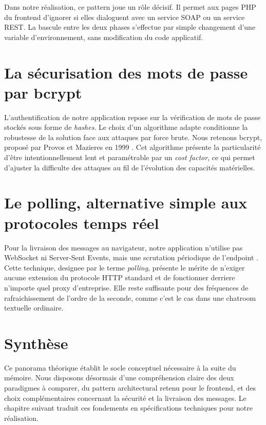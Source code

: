 Dans notre réalisation, ce pattern joue un rôle décisif. Il permet aux pages PHP du frontend d'ignorer si elles dialoguent avec un service SOAP ou un service REST. La bascule entre les deux phases s'effectue par simple changement d'une variable d'environnement, sans modification du code applicatif.

\section{La sécurisation des mots de passe par bcrypt}

L'authentification de notre application repose sur la vérification de mots de passe stockés sous forme de \emph{hashes}. Le choix d'un algorithme adapte conditionne la robustesse de la solution face aux attaques par force brute. Nous retenons bcrypt, proposé par Provos et Mazieres en 1999 \citep{provos1999}. Cet algorithme présente la particularité d'être intentionnellement lent et paramétrable par un \emph{cost factor}, ce qui permet d'ajuster la difficulte des attaques au fil de l'évolution des capacités matérielles.

\section{Le polling, alternative simple aux protocoles temps réel}

Pour la livraison des messages au navigateur, notre application n'utilise pas WebSocket ni Server-Sent Events, mais une scrutation périodique de l'endpoint . Cette technique, designee par le terme \emph{polling}, présente le mérite de n'exiger aucune extension du protocole HTTP standard et de fonctionner derriere n'importe quel proxy d'entreprise. Elle reste suffisante pour des fréquences de rafraichissement de l'ordre de la seconde, comme c'est le cas dans une chatroom textuelle ordinaire.

\section{Synthèse}

Ce panorama théorique établit le socle conceptuel nécessaire à la suite du mémoire. Nous disposons désormais d'une compréhension claire des deux paradigmes à comparer, du pattern architectural retenu pour le frontend, et des choix complémentaires concernant la sécurité et la livraison des messages. Le chapitre suivant traduit ces fondements en spécifications techniques pour notre réalisation.
